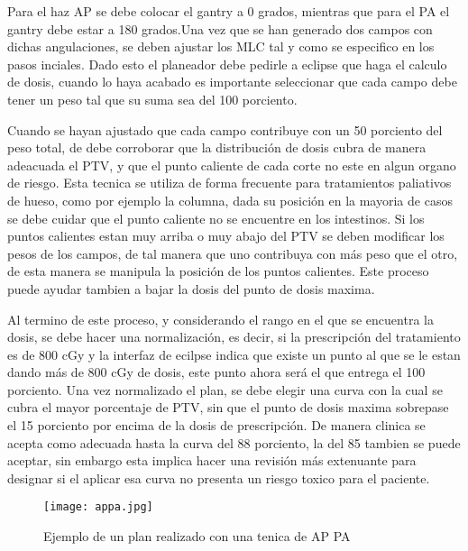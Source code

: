 \documentclass{article}
\begin{document}
\vspace{10pt}

Para el haz AP se debe colocar el gantry a 0 grados, mientras que para el PA el gantry debe estar a 180 grados.Una vez que se han generado dos campos con dichas angulaciones, se deben ajustar los MLC tal y como se especifico en los pasos inciales. Dado esto el planeador debe pedirle a eclipse que haga el calculo de dosis, cuando lo haya acabado es importante seleccionar que cada campo debe tener un peso tal que su suma sea del 100 porciento. 

\vspace{10pt}

Cuando se hayan ajustado que cada campo contribuye con un 50 porciento del peso total, de debe corroborar que la distribución de dosis cubra de manera adeacuada el PTV, y que el punto caliente de cada corte no este en algun organo de riesgo. Esta tecnica se utiliza de forma frecuente para tratamientos paliativos de hueso, como por ejemplo la columna, dada su posición en la mayoria de casos se debe cuidar que el punto caliente no se encuentre en los intestinos. Si los puntos calientes estan muy arriba o muy abajo del PTV se deben modificar los pesos de los campos, de tal manera que uno contribuya con más peso que el otro, de esta manera se manipula la posición de los puntos calientes. Este proceso puede ayudar tambien a bajar la dosis del punto de dosis maxima.

\vspace{10pt}

Al termino de este proceso, y considerando el rango en el que se encuentra la dosis, se debe hacer una normalización, es decir, si la prescripción del tratamiento es de 800 cGy y la interfaz de ecilpse indica que existe un punto al que se le estan dando más de 800 cGy de dosis, este punto ahora será el que entrega el 100 porciento. Una vez normalizado el plan, se debe elegir una curva con la cual se cubra el mayor porcentaje de PTV, sin que el punto de dosis maxima sobrepase el 15 porciento por encima de la dosis de prescripción. De manera clinica se acepta como adecuada hasta la curva del 88 porciento, la del 85 tambien se puede aceptar, sin embargo esta implica hacer una revisión más extenuante para designar si el aplicar esa curva no presenta un riesgo toxico para el paciente. 

\vspace{10pt}

\begin{figure}[h!]
    \centering
    \texttt{[image: appa.jpg]}
    \caption{Ejemplo de un plan realizado con una tenica de AP PA}
    \label{a1}
\end{figure}
\end{document}
